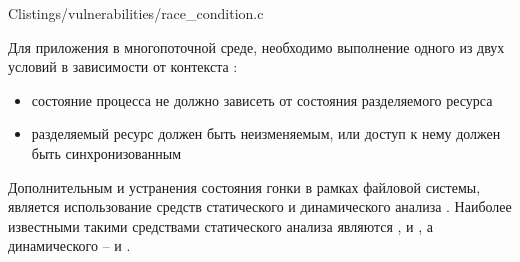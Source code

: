 \newpage
{}
	{C}{listings/vulnerabilities/race_condition.c}

%
Для  приложения в многопоточной среде, необходимо выполнение одного из двух условий в зависимости от контекста  : 
\begin{itemize}
	
	\item состояние процесса не должно зависеть от состояния разделяемого ресурса
	
	\item разделяемый ресурс должен быть неизменяемым, или доступ к нему должен быть синхронизованным 
\end{itemize}

%
Дополнительным  и устранения состояния гонки в рамках файловой системы, является использование средств статического и динамического анализа . 
%
Наиболее известными такими средствами статического анализа являются  ,   и  , а динамического –   и  . 